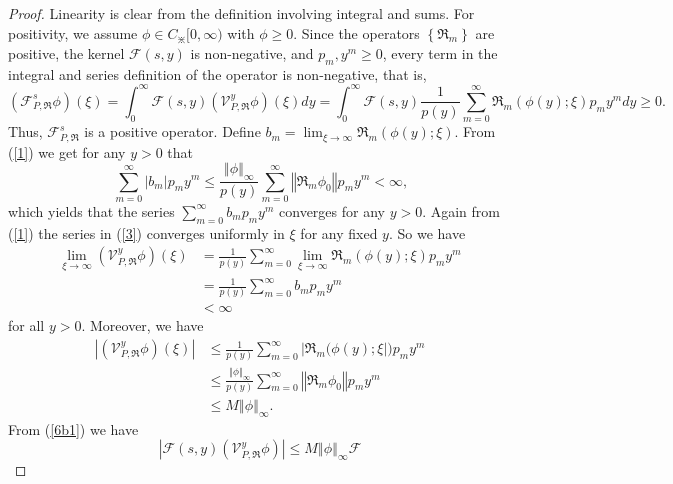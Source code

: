 \documentclass{amsart}
\theoremstyle{plain}
\numberwithin{equation}{section}
\begin{document}
\begin{proof}
Linearity is clear from the definition involving integral and sums. For
positivity, we assume $\phi \in C_{\divideontimes}[0,\infty)$ with $\phi \geq0$.
Since the operators $\left \{  \Re_{m}\right \}  $ are positive, the kernel
$\mathcal{F}(s,y)$ is non-negative, and $p_{m},y^{m}\geq0$, every term in the
integral and series definition of the operator is non-negative, that is,
\[
\left(  \mathcal{F}_{P,\Re}^{s}\phi \right)  (\xi)=\int_{0}^{\infty}%
\mathcal{F}(s,y)\left(  \mathcal{V}_{P,\Re}^{y}\phi \right)  \left(
\xi \right)  dy=\int_{0}^{\infty}\mathcal{F}(s,y)\frac{1}{p(y)}\sum
_{m=0}^{\infty}\Re_{m}(\phi(y);\xi)p_{m}y^{m}dy\geq0.
\]
Thus, $\mathcal{F}_{P,\Re}^{s}$ is a positive operator. Define $b_{m}%
=\displaystyle \lim_{\xi \rightarrow \infty}\Re_{m}(\phi(y);\xi)$. From (\ref{1})
we get for any $y>0$ that%
\[
\sum_{m=0}^{\infty}\left \vert b_{m}\right \vert p_{m}y^{m}\leq \frac{\left \Vert
\phi \right \Vert _{\infty}}{p(y)}\sum_{m=0}^{\infty}\left \Vert \Re_{m}\phi
_{0}\right \Vert p_{m}y^{m}<\infty \text{,}%
\]
which yields that the series $\displaystyle \sum_{m=0}^{\infty}b_{m}p_{m}y^{m}$
converges for any $y>0$. Again from (\ref{1}) the series in (\ref{3})
converges uniformly in $\xi$ for any fixed $y$. So we have
\begin{align}
\lim_{\xi \rightarrow \infty}\left(  \mathcal{V}_{P,\Re}^{y}\phi \right)  (\xi)
&  =\frac{1}{p(y)}\sum_{m=0}^{\infty}\lim_{\xi \rightarrow \infty}\Re_{m}%
(\phi(y);\xi)p_{m}y^{m}\nonumber \\
&  =\frac{1}{p(y)}\sum_{m=0}^{\infty}b_{m}p_{m}y^{m}\nonumber \\
&  <\infty \label{6b}%
\end{align}
for all $y>0$. Moreover, we have
\begin{align}
\left \vert \left(  \mathcal{V}_{P,\Re}^{y}\phi \right)  \left(  \xi \right)
\right \vert  &  \leq \frac{1}{p(y)}\sum_{m=0}^{\infty}\left \vert \Re_{m}%
(\phi(y);\xi \right \vert )p_{m}y^{m}\nonumber \\
&  \leq \frac{\left \Vert \phi \right \Vert _{\infty}}{p(y)}\sum_{m=0}^{\infty
}\left \Vert \Re_{m}\phi_{0}\right \Vert p_{m}y^{m}\nonumber \\
&  \leq M\left \Vert \phi \right \Vert _{\infty}.\label{6b1}%
\end{align}
From (\ref{6b1}) we have
\begin{equation}
\left \vert \mathcal{F}(s,y)\left(  \mathcal{V}_{P,\Re}^{y}\phi \right)
\right \vert \leq M\left \Vert \phi \right \Vert _{\infty}\mathcal{F}%

\end{equation}
\end{proof}
\end{document}
